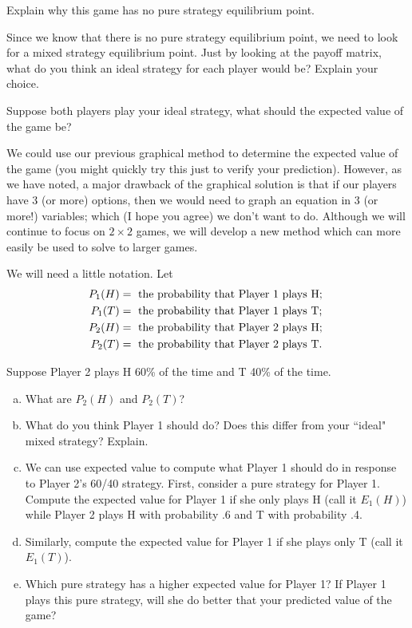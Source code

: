 \begin{xca}\label{E:mpnoequil}
Explain why this game has no pure strategy equilibrium point.
\end{xca}

\begin{xca}\label{E:mpguess}
Since we know that there is no pure strategy equilibrium point, we need to look for a mixed strategy equilibrium point. Just by looking at the payoff matrix, what do you think an ideal strategy for each player would be? Explain your choice. 
\end{xca}

\begin{xca}\label{E:mpguessev}
Suppose both players play your ideal strategy, what should the expected value of the game be?
\end{xca}

We could use our previous graphical method to determine the expected value of the game (you might quickly try this just to verify your prediction). However, as we have noted, a major drawback of the graphical solution is that if our players have 3 (or more) options, then we would need to graph an equation in 3 (or more!) variables; which (I hope you agree) we don't want to do.  Although we will continue to focus on $2 \times 2$ games, we will develop a new method which can more easily be used to solve to larger games. 

We will need a little notation. Let 
\begin{align}
P_1(H) & = \mbox{ the probability that Player 1 plays H; } \notag\\
P_1(T) & = \mbox{ the probability that Player 1 plays T;} \notag \\
P_2(H) & = \mbox{ the probability that Player 2 plays H; } \notag\\
P_2(T) & = \mbox{ the probability that Player 2 plays T.} \notag
\end{align}

\begin{xca}\label{E:mpP2 60/40}
Suppose Player 2 plays H 60\% of the time and T 40\% of the time. 
\begin{enumerate}[(a)]
\item What are $P_2(H)$ and $P_2(T)$?
\item What do you think Player 1 should do? Does this differ from your ``ideal" mixed strategy? Explain.
\item We can use expected value to compute what Player 1 should do in response to Player 2's 60/40 strategy. First, consider a pure strategy for Player 1. Compute the expected value for Player 1 if she only plays H (call it $E_1(H)$) while Player 2 plays H with probability .6  and T with probability .4.
\item Similarly, compute the expected value for Player 1 if she plays only T (call it $E_1(T)$).
\item Which pure strategy has a higher expected value for Player 1? If Player 1 plays this pure strategy, will she do better that your predicted value of the game?
\end{enumerate}
\end{xca}

